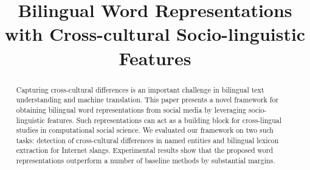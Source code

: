 \documentclass{article}
\title{Bilingual Word Representations with Cross-cultural Socio-linguistic Features}
\author{}
\begin{document}
\begin{CJK}{UTF8}{gbsn}

\maketitle

\begin{abstract} 
Capturing cross-cultural differences is an important challenge in bilingual text understanding
and machine translation. This paper presents a novel framework for obtaining bilingual
word representations from social media by leveraging socio-linguistic features. 
Such representations can act as a building block for cross-lingual studies in computational social science.
We evaluated our framework on two such tasks: detection of cross-cultural differences in named entities
and bilingual lexicon extraction for Internet slangs. Experimental results show that the proposed word representations outperform a number of baseline methods by substantial margins.
\end{abstract}










\end{CJK}
\end{document}
